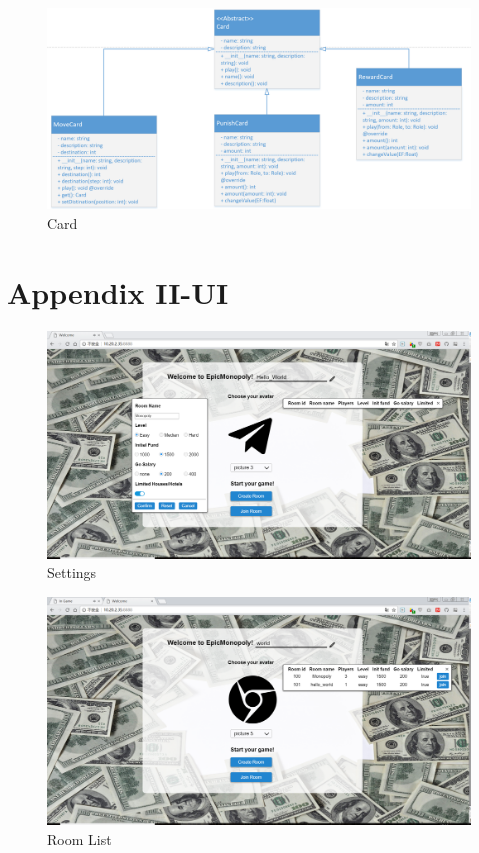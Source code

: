 \documentclass[a4paper,11pt]{article}
\begin{document}
\begin{figure}[H]
\includegraphics[scale=0.22]{image/card.png}
\caption{Card}
\end{figure}

\section*{Appendix II-UI}
\begin{figure}[H]
\includegraphics[scale=0.32]{image/login.png}
\caption{Settings}
\end{figure}
\begin{figure}[H]
\includegraphics[scale=0.32]{image/login1.png}
\caption{Room List}
\end{figure}
\end{document}
